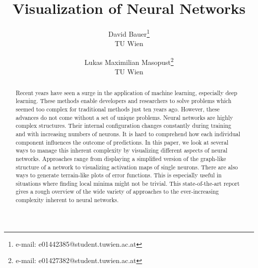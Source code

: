 \documentclass{acmsiggraph}               %
\title{Visualization of Neural Networks}
\author{David Bauer\thanks{e-mail: e01442385@student.tuwien.ac.at}\\ TU Wien %
\and Lukas Maximilian Masopust\thanks{e-mail: e01427382@student.tuwien.ac.at}\\ TU Wien %
}
\begin{document}




\maketitle



\begin{abstract}
Recent years have seen a surge in the application of machine learning, especially deep learning. These methods enable developers and researchers to solve problems which seemed too complex for traditional methods just ten years ago. However, these advances do not come without a set of unique problems. Neural networks are highly complex structures. Their internal configuration changes constantly during training and with increasing numbers of neurons. It is hard to comprehend how each individual component influences the outcome of predictions.
In this paper, we look at several ways to manage this inherent complexity by visualizing different aspects of neural networks. Approaches range from displaying a simplified version of the graph-like structure of a network to visualizing activation maps of single neurons. There are also ways to generate terrain-like plots of error functions. This is especially useful in situations where finding local minima might not be trivial.
This state-of-the-art report gives a rough overview of the wide variety of approaches to the ever-increasing complexity inherent to neural networks.
\end{abstract}
\end{document}
